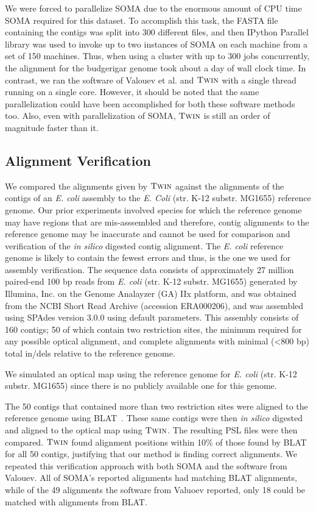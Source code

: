 We were forced to parallelize SOMA due to the enormous amount of CPU time SOMA required for this dataset.  To accomplish this task, the FASTA file containing the contigs was split into 300 different files, and then IPython Parallel library was used to invoke up to two instances of SOMA on each machine from a set of 150 machines.  Thus, when using a cluster with up to 300 jobs concurrently, the alignment for the budgerigar genome took about a day of wall clock time. In contrast, we ran the software of Valouev et al. and $\mbox{\rm {\sc Twin}}$ with a single thread running on a single core.  However, it should be noted that the same parallelization could have been accomplished for both these software methods too. Also, even with parallelization of SOMA, $\mbox{\rm {\sc Twin}}$ is still an order of magnitude faster than it.




\subsection{Alignment Verification} \label{sec:ecoli}

We compared the alignments given by $\mbox{\rm {\sc Twin}}$ against the alignments of the contigs of an {\em E. coli} assembly to the \emph{E. Coli} (str. K-12 substr. MG1655) reference genome.  Our prior experiments involved species for which the reference genome may have regions that are mis-asssembled and therefore, contig alignments to the reference genome may be inaccurate and cannot be used for comparison and verification of the {\em in silico} digested contig alignment.   The {\em E. coli} reference genome is likely to contain the fewest errors and thus, is the one we used for assembly verification.  The sequence data consists of approximately 27 million paired-end 100 bp reads from {\em E. coli} (str. K-12 substr. MG1655) generated by Illumina, Inc. on the Genome Analayzer (GA) IIx platform, and  was obtained from the NCBI Short Read Archive (accession ERA000206), and was assembled using SPAdes version 3.0.0 \cite{spades} using default parameters.  This assembly consists of 160 contigs; 50 of which contain two restriction sites, the minimum required for any possible optical alignment, and complete alignments with minimal (\textless 800 bp) total in/dels relative to the reference genome.

We simulated an optical map using the reference genome for {\em E. coli} (str. K-12 substr. MG1655) since there is no publicly available one for this genome.  

The 50 contigs that contained more than two restriction sites were aligned to the reference genome using BLAT~\cite{blat}.  These same contigs were then {\em in silico} digested and aligned to the optical map using $\mbox{\rm {\sc Twin}}$.  The resulting PSL files were then compared.  $\mbox{\rm {\sc Twin}}$ found alignment positions within 10\% of those found by BLAT for all 50 contigs, justifying that our method is finding correct alignments.  We repeated this verification approach with both SOMA and the software from Valouev.  All of SOMA's reported alignments had matching BLAT alignments, while of the 49 alignments the software from Valuoev reported, only 18 could be matched with alignments from BLAT.
